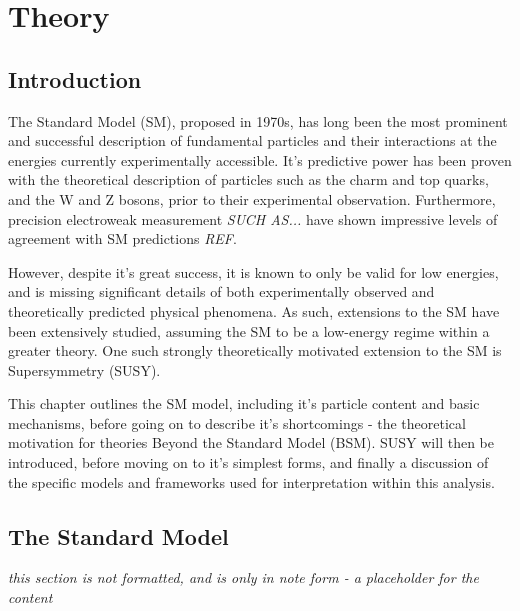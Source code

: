
\chapter{Theory}
\label{ch:2}

\ifpdf
    \graphicspath{{Chapter2/Figs/Raster/}{Chapter2/Figs/PDF/}{Chapter2/Figs/}}
\else
    \graphicspath{{Chapter2/Figs/Vector/}{Chapter2/Figs/}}
\fi


\section{Introduction}  %
\label{sec:theory_intro}

The Standard Model (SM), proposed in 1970s, has long been the most prominent and 
successful description of fundamental particles and their interactions at the
energies currently experimentally accessible. It's predictive power has been proven with the 
theoretical description of particles such as the charm and top quarks, and the W and
Z bosons, prior to their experimental observation. Furthermore, precision 
electroweak measurement \emph{SUCH AS...} have shown impressive levels of 
agreement with SM predictions \emph{REF}.

However, despite it's great success, it is known to only be valid for low 
energies, and is missing significant details of both experimentally 
observed and theoretically predicted physical phenomena. As such, extensions to
the SM have been extensively studied, assuming the SM to be a low-energy 
regime within a greater theory. One such strongly theoretically motivated extension 
to the SM is Supersymmetry (SUSY).

This chapter outlines the SM model, including it's particle content and basic 
mechanisms, before going on to describe it's shortcomings - the theoretical 
motivation for theories Beyond the Standard Model (BSM). SUSY will then be 
introduced, before moving on to it's simplest forms, and finally a discussion of
the specific models and frameworks used for interpretation within this analysis.

\section{The Standard Model}
\label{sec:theory_current}
\emph{this section is not formatted, and is only in note form - a placeholder
for the content}

